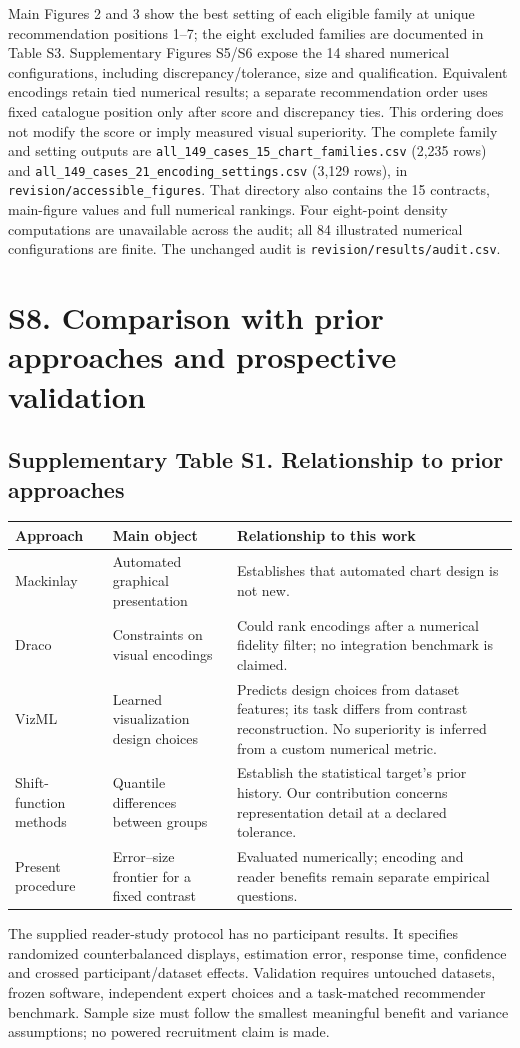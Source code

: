\documentclass[10pt]{article}
\begin{document}
Main Figures 2 and 3 show the best setting of each eligible family at unique recommendation positions 1--7; the eight excluded families are documented in Table S3. Supplementary Figures S5/S6 expose the 14 shared numerical configurations, including discrepancy/tolerance, size and qualification. Equivalent encodings retain tied numerical results; a separate recommendation order uses fixed catalogue position only after score and discrepancy ties. This ordering does not modify the score or imply measured visual superiority. The complete family and setting outputs are \nolinkurl{all_149_cases_15_chart_families.csv} (2,235 rows) and \nolinkurl{all_149_cases_21_encoding_settings.csv} (3,129 rows), in \nolinkurl{revision/accessible_figures}. That directory also contains the 15 contracts, main-figure values and full numerical rankings. Four eight-point density computations are unavailable across the audit; all 84 illustrated numerical configurations are finite. The unchanged audit is \nolinkurl{revision/results/audit.csv}.

\section*{S8. Comparison with prior approaches and prospective validation}
\subsection*{Supplementary Table S1. Relationship to prior approaches}
\begin{longtable}{p{2.4cm}p{4.8cm}p{7.4cm}}\toprule
Approach & Main object & Relationship to this work\\\midrule
Mackinlay\cite{mackinlay1986} & Automated graphical presentation & Establishes that automated chart design is not new.\\
Draco\cite{draco} & Constraints on visual encodings & Could rank encodings after a numerical fidelity filter; no integration benchmark is claimed.\\
VizML\cite{vizml} & Learned visualization design choices & Predicts design choices from dataset features; its task differs from contrast reconstruction. No superiority is inferred from a custom numerical metric.\\
Shift-function methods\cite{rousselet2017} & Quantile differences between groups & Establish the statistical target's prior history. Our contribution concerns representation detail at a declared tolerance.\\
Present procedure & Error--size frontier for a fixed contrast & Evaluated numerically; encoding and reader benefits remain separate empirical questions.\\\bottomrule
\end{longtable}
The supplied reader-study protocol has no participant results. It specifies randomized counterbalanced displays, estimation error, response time, confidence and crossed participant/dataset effects. Validation requires untouched datasets, frozen software, independent expert choices and a task-matched recommender benchmark. Sample size must follow the smallest meaningful benefit and variance assumptions; no powered recruitment claim is made.
\end{document}
